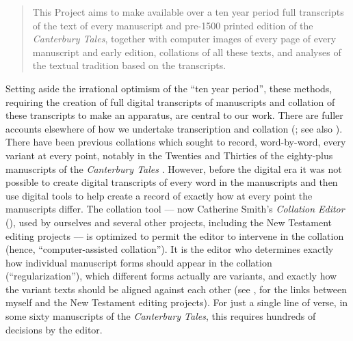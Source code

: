 \documentclass{article}
\begin{document}
\begin{quote}
This Project aims to make available over a ten year period full
transcripts of the text of every manuscript and pre-1500 printed edition
of the \emph{Canterbury Tales}, together with computer images of every
page of every manuscript and early edition, collations of all these
texts, and analyses of the textual tradition based on the transcripts.

\begin{flushright}
    \parencite{robinson_canterbury_1993}
\end{flushright}

\end{quote}

\noindent Setting aside the irrational optimism of the ``ten year period'', these
methods, requiring the creation of full digital transcripts of
manuscripts and collation of these transcripts to make an apparatus, are
central to our work. There are fuller accounts elsewhere of how we
undertake transcription and collation (\cite{bitner_macron_2021}; see also \cite{bordalejo_youre_2021}). There have been previous collations which
sought to record, word-by-word, every variant at every point, notably in
the Twenties and Thirties of the eighty-plus manuscripts of the
\emph{Canterbury Tales} \parencite{manly_text_1940}. However, before the
digital era it was not possible to create digital transcripts of every
word in the manuscripts and then use digital tools to help create a
record of exactly how at every point the manuscripts differ. The
collation tool –– now Catherine Smith's \emph{Collation Editor}
(\citeyear{smith_collation_2018}), used by ourselves and several other projects, including the
New Testament editing projects –– is optimized to permit the editor to
intervene in the collation (hence, ``computer-assisted collation''). It
is the editor who determines exactly how individual manuscript forms
should appear in the collation (``regularization''), which different
forms actually are variants, and exactly how the variant texts should be
aligned against each other (see \cite{houghton_editio_2020}, for the links
between myself and the New Testament editing projects). For just a
single line of verse, in some sixty manuscripts of the \emph{Canterbury
Tales}, this requires hundreds of decisions by the editor.
\end{document}
